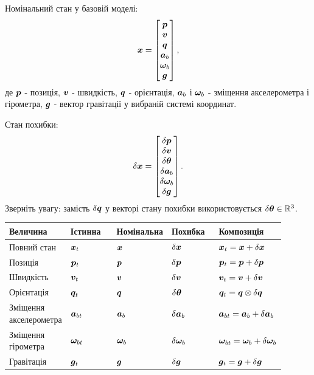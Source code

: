 Номінальний стан у базовій моделі:
\begin{equation}\label{eq:nominal_state_imu}
\bm{x}=\begin{bmatrix}
\bm{p}\\
\bm{v}\\
\bm{q}\\
\bm{a}_b\\
\bm{\omega}_b\\
\bm{g}
\end{bmatrix},
\end{equation}
де $\bm{p}$ - позиція, $\bm{v}$ - швидкість, $\bm{q}$ - орієнтація, $\bm{a}_b$ і $\bm{\omega}_b$ - зміщення акселерометра і гірометра, $\bm{g}$ - вектор гравітації у вибраній системі координат.

Стан похибки:
\begin{equation}\label{eq:error_state_imu}
\delta\bm{x}=\begin{bmatrix}
\delta\bm{p}\\
\delta\bm{v}\\
\delta\bm{\theta}\\
\delta\bm{a}_b\\
\delta\bm{\omega}_b\\
\delta\bm{g}
\end{bmatrix}.
\end{equation}
Зверніть увагу: замість $\delta\bm{q}$ у векторі стану похибки використовується $\delta\bm{\theta}\in\mathbb{R}^3$.

\begin{longtable}{L{0.18\linewidth}L{0.18\linewidth}L{0.18\linewidth}L{0.18\linewidth}L{0.18\linewidth}}
\toprule
Величина & Істинна & Номінальна & Похибка & Композиція\\
\midrule
Повний стан & $\bm{x}_t$ & $\bm{x}$ & $\delta\bm{x}$ & $\bm{x}_t=\bm{x}+\delta\bm{x}$\\
Позиція & $\bm{p}_t$ & $\bm{p}$ & $\delta\bm{p}$ & $\bm{p}_t=\bm{p}+\delta\bm{p}$\\
Швидкість & $\bm{v}_t$ & $\bm{v}$ & $\delta\bm{v}$ & $\bm{v}_t=\bm{v}+\delta\bm{v}$\\
Орієнтація & $\bm{q}_t$ & $\bm{q}$ & $\delta\bm{\theta}$ & $\bm{q}_t=\bm{q}\otimes\delta\bm{q}$\\
Зміщення акселерометра & $\bm{a}_{bt}$ & $\bm{a}_b$ & $\delta\bm{a}_b$ & $\bm{a}_{bt}=\bm{a}_b+\delta\bm{a}_b$\\
Зміщення гірометра & $\bm{\omega}_{bt}$ & $\bm{\omega}_b$ & $\delta\bm{\omega}_b$ & $\bm{\omega}_{bt}=\bm{\omega}_b+\delta\bm{\omega}_b$\\
Гравітація & $\bm{g}_t$ & $\bm{g}$ & $\delta\bm{g}$ & $\bm{g}_t=\bm{g}+\delta\bm{g}$\\
\bottomrule
\end{longtable}

